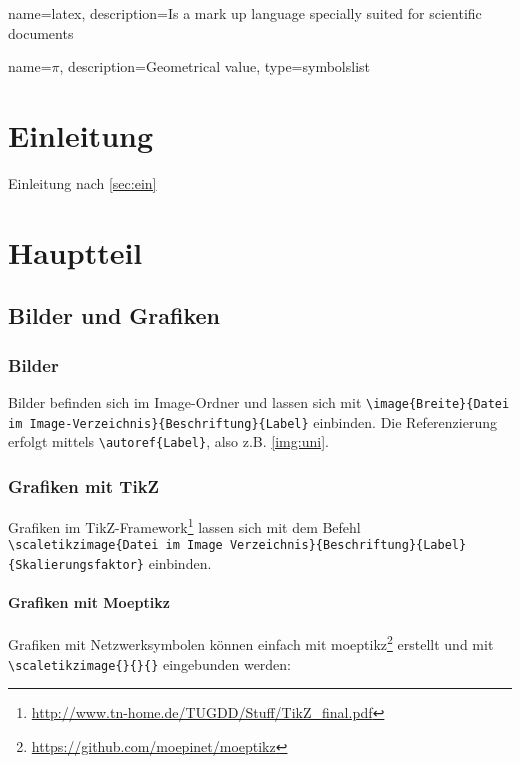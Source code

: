 
{
        name=latex,
        description={Is a mark up language specially suited for scientific documents}
}

{
        name=\ensuremath{\pi},
        description={Geometrical value},
        type=symbolslist
}

\lstset{language=TeX}

\section{Einleitung}\label{sec:ein}
Einleitung nach \autoref{sec:ein}

\section{Hauptteil}\label{sec:haupt}
\subsection{Bilder und Grafiken}\label{subsec:grafiken}

\subsubsection{Bilder}\label{subsubsec:bilder}
Bilder befinden sich im Image-Ordner und lassen sich mit \lstinline|\image{Breite}{Datei im Image-Verzeichnis}{Beschriftung}{Label}| einbinden.  Die Referenzierung erfolgt mittels \lstinline|\autoref{Label}|, also z.B. \autoref{img:uni}.

\subsubsection{Grafiken mit TikZ}
Grafiken im TikZ-Framework\footnote{\url{http://www.tn-home.de/TUGDD/Stuff/TikZ_final.pdf}} lassen sich mit dem Befehl \lstinline|\scaletikzimage{Datei im Image Verzeichnis}{Beschriftung}{Label}{Skalierungsfaktor}| einbinden. 

\paragraph{Grafiken mit Moeptikz}

Grafiken mit Netzwerksymbolen können einfach mit moeptikz\footnote{\url{https://github.com/moepinet/moeptikz}} erstellt und mit \lstinline|\scaletikzimage{}{}{}| eingebunden werden:

